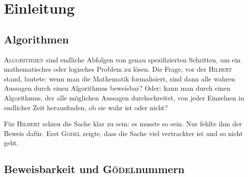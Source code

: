 \section*{Einleitung}

\let\originalthefootnote\thefootnote
\renewcommand*{\thefootnote}{\fnsymbol{footnote}}

\subsection*{Algorithmen}

\lettrine[nindent=0em]{\color{purple}A}{lgorithmen} sind endliche Abfolgen von
genau spezifizierten Schritten, um ein mathematisches oder logisches Problem zu lösen.
Die Frage, vor der \textsc{Hilbert} stand, lautete: wenn man die Mathematik formalisiert,
sind dann alle wahren Aussagen durch einen Algorithmus beweisbar? Oder: kann man durch
einen Algorithmus, der alle möglichen Aussagen durchschreitet, von jeder Einzelnen
in endlicher Zeit herausfinden, ob sie wahr ist oder nicht?

Für \textsc{Hilbert} schien die Sache klar zu sein: es musste so sein. Nur fehlte ihm der Beweis
dafür. Erst \textsc{Gödel} zeigte, dass die Sache viel vertrackter ist und so nicht geht.

\subsection*{Beweisbarkeit und \textsc{Gödel}nummern}

